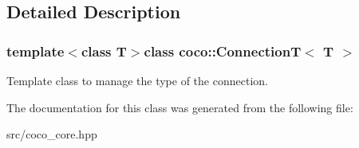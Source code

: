 \subsection{Detailed Description}
\subsubsection*{template$<$class T$>$class coco\+::\+Connection\+T$<$ T $>$}

Template class to manage the type of the connection. 

The documentation for this class was generated from the following file\+:\begin{DoxyCompactItemize}
\item 
src/coco\+\_\+core.\+hpp\end{DoxyCompactItemize}
